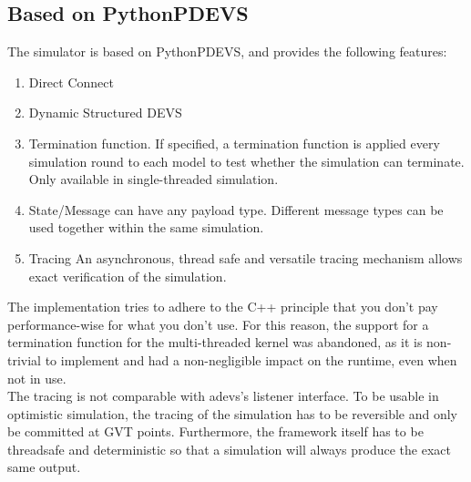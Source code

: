 \subsection{Based on PythonPDEVS}
The simulator is based on PythonPDEVS, and provides the following features: 
\begin{enumerate}
	\item Direct Connect
	\item Dynamic Structured DEVS
	\item Termination function. If specified, a termination function is applied every simulation round to each model to test whether the simulation can terminate. Only available in single-threaded simulation.
	\item State/Message can have any payload type. Different message types can be used together within the same simulation.
	\item Tracing An asynchronous, thread safe and versatile tracing mechanism allows exact verification of the simulation.
\end{enumerate}
The implementation tries to adhere to the C++ principle that you don't pay performance-wise for what you don't use. For this reason, the support for a termination function for the multi-threaded kernel was abandoned, as it is non-trivial to implement and had a non-negligible impact on the runtime, even when not in use.\\
The tracing is not comparable with adevs's listener interface. To be usable in optimistic simulation, the tracing of the simulation has to be reversible and only be committed at GVT points. Furthermore, the framework itself has to be threadsafe and deterministic so that a simulation will always produce the exact same output.
